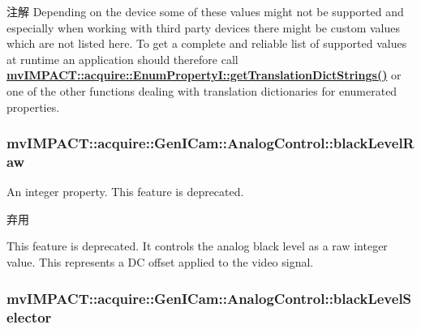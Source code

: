 \begin{DoxyNote}{注解}
Depending on the device some of these values might not be supported and especially when working with third party devices there might be custom values which are not listed here. To get a complete and reliable list of supported values at runtime an application should therefore call {\bfseries \hyperlink{classmv_i_m_p_a_c_t_1_1acquire_1_1_enum_property_i_a0ba6ccbf5ee69784d5d0b537924d26b6}{mv\+I\+M\+P\+A\+C\+T\+::acquire\+::\+Enum\+Property\+I\+::get\+Translation\+Dict\+Strings()}} or one of the other functions dealing with translation dictionaries for enumerated properties. 
\end{DoxyNote}
\hypertarget{classmv_i_m_p_a_c_t_1_1acquire_1_1_gen_i_cam_1_1_analog_control_a35d90d2341a108de88e058d69a1ad1d1}{
\subsubsection[{black\+Level\+Raw}]{ mv\+I\+M\+P\+A\+C\+T\+::acquire\+::\+Gen\+I\+Cam\+::\+Analog\+Control\+::black\+Level\+Raw}}\label{classmv_i_m_p_a_c_t_1_1acquire_1_1_gen_i_cam_1_1_analog_control_a35d90d2341a108de88e058d69a1ad1d1}


An integer property. This feature is deprecated. 

\begin{DoxyRefDesc}{弃用}
\item[\hyperlink{deprecated__deprecated000049}{弃用}]This feature is deprecated. It controls the analog black level as a raw integer value. This represents a D\+C offset applied to the video signal. \end{DoxyRefDesc}
\hypertarget{classmv_i_m_p_a_c_t_1_1acquire_1_1_gen_i_cam_1_1_analog_control_aed154d5698e9b118b98b73ec4779836b}{
\subsubsection[{black\+Level\+Selector}]{ mv\+I\+M\+P\+A\+C\+T\+::acquire\+::\+Gen\+I\+Cam\+::\+Analog\+Control\+::black\+Level\+Selector}}\label{classmv_i_m_p_a_c_t_1_1acquire_1_1_gen_i_cam_1_1_analog_control_aed154d5698e9b118b98b73ec4779836b}


